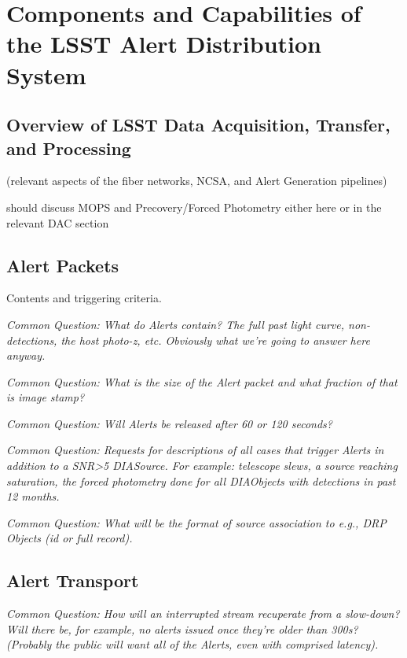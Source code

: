 \section{Components and Capabilities of the LSST Alert Distribution System}\label{sec:components}


\subsection{Overview of LSST Data Acquisition, Transfer, and Processing}

(relevant aspects of the fiber networks, NCSA, and Alert Generation pipelines)

should discuss MOPS and Precovery/Forced Photometry either here or in the relevant DAC section


\subsection{Alert Packets}

Contents and triggering criteria.

{\it Common Question: What do Alerts contain? The full past light curve, non-detections, the host photo-z, etc. Obviously what we're going to answer here anyway.}

{\it Common Question: What is the size of the Alert packet and what fraction of that is image stamp?}

{\it Common Question: Will Alerts be released after 60 or 120 seconds?}

{\it Common Question: Requests for descriptions of all cases that trigger Alerts in addition to a SNR>5 DIASource. For example: telescope slews, a source reaching saturation, the forced photometry done for all DIAObjects with detections in past 12 months.}

{\it Common Question: What will be the format of source association to e.g., DRP Objects (id or full record).}



\subsection{Alert Transport}

{\it Common Question: How will an interrupted stream recuperate from a slow-down? Will there be, for example, no alerts issued once they're older than 300s? (Probably the public will want all of the Alerts, even with comprised latency).}

